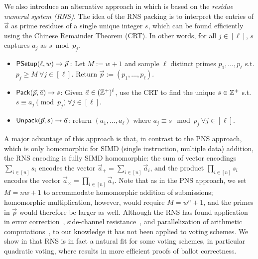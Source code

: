 We also introduce an alternative approach in  which is based on the \emph{residue numeral system (RNS)}. The idea of the RNS packing is to interpret the entries of $\vec{a}$ as prime residues of a single unique integer $s$, which can be found efficiently using the Chinese Remainder Theorem (CRT). In other words, for all $j \in [\ell]$, $s$ captures $a_j$ as $s \bmod p_j$.

\begin{construction}\label{con:packingRNS}
\hfill
\begin{itemize}%
    \item $\mathsf{PSetup}(\ell, w) \to \vec{p}:$ Let $M := w + 1$ and sample $\ell$ distinct primes $p_1, \dots, p_\ell$ s.t. $p_j \geq M\ \forall j \in [\ell]$. Return $\vec{p} := (p_1, \dots, p_\ell)$.
    \item $\mathsf{Pack}(\vec{p}, \Vec{a}) \to s$: Given $\Vec{a} \in (\mathbb{Z}^+)^\ell$, use the CRT to find the unique $s \in \mathbb{Z}^+$ s.t. $s\equiv a_j \pmod{p_j}~\forall j\in[\ell]$.
    \item $\mathsf{Unpack}(\vec{p}, s) \to \Vec{a}$: return $(a_1, \dots, a_\ell)$ where $a_j \equiv s \mod{p_j}\ \forall j \in [\ell]$.
\end{itemize}
\end{construction}

A major advantage of this approach is that, in contrast to the PNS approach, which is only homomorphic for SIMD (single instruction, multiple data) addition, the RNS encoding is fully SIMD homomorphic: the sum of vector encodings $\sum_{i \in [n]} s_i$ encodes the vector $\vec{a}_{+} = \sum_{i \in [n]} \vec{a}_i$, and the product $\prod_{i \in [n]} s_i$ encodes the vector $\vec{a}_{\times} = \prod_{i \in [n]} \vec{a}_i$. Note that as in the PNS approach, we set $M = nw + 1$ to accommodate homomorphic addition of submissions; homomorphic multiplication, however, would require $M = w^n+1$, and the primes in $\vec{p}$ would therefore be larger as well.
Although the RNS has found application in error correction~\cite{KPTOC22,TaiCha14}, side-channel resistance~\cite{TCHES:PFPB18}, and parallelization of arithmetic computations~\cite{AsiHosKon17,BajDuqMel06,GomTyaNam11,VNLVC20}, to our knowledge it has not been applied to voting schemes. We show in \cite{EPRINT:GSZB23} that RNS is in fact a natural fit for some voting schemes, in particular quadratic voting, where results in more efficient proofs of ballot correctness. 

